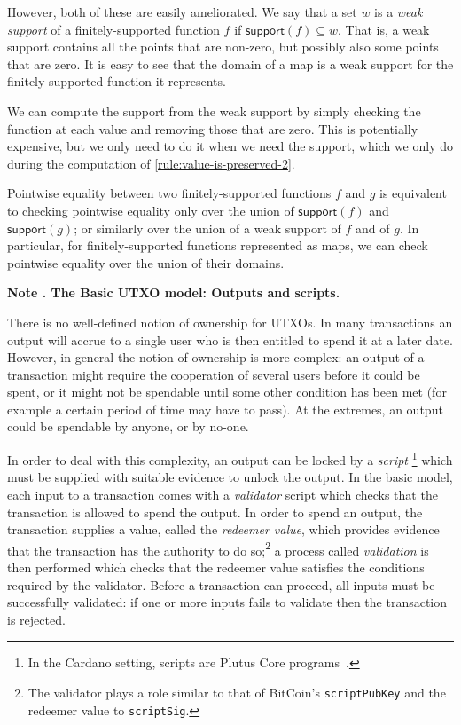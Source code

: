 \documentclass[a4paper]{article}
\newcounter{note}
\newcommand{\note}[1]{
  \bigskip
  \refstepcounter{note}
  \noindent\textbf{Note \thenote. #1}
}
\renewcommand{\i}{\textit}  %
\newcommand{\msf}[1]{\ensuremath{\mathsf{#1}}}
\newcommand{\support}{\msf{support}}
\begin{document}
However, both of these are easily ameliorated. We say that a set $w$ is a \textit{weak support}
of a finitely-supported function $f$ if $\support(f) \subseteq w$. That is, a
weak support contains all the points that are non-zero, but possibly also some
points that are zero. It is easy to see that the domain of a map is a weak
support for the finitely-supported function it represents.

We can compute the support from the weak support by simply checking the function
at each value and removing those that are zero. This is potentially expensive,
but we only need to do it when we need the support, which we only do during the
computation of \cref{rule:value-is-preserved-2}.

Pointwise equality between two finitely-supported functions $f$ and $g$ is
equivalent to checking pointwise equality only over the union of $\support(f)$
and $\support(g)$; or similarly over the union of a weak support of $f$ and of
$g$. In particular, for finitely-supported functions represented as maps, we can
check pointwise equality over the union of their domains.

\note{The Basic UTXO model: Outputs and scripts.}
\label{note:basic-utxo}
There is no well-defined notion of ownership for UTXOs.  In many
transactions an output will accrue to a single user who is then
entitled to spend it at a later date.  However, in general the notion
of ownership is more complex: an output of a transaction might require
the cooperation of several users before it could be spent, or it might
not be spendable until some other condition has been met (for example
a certain period of time may have to pass).  At the extremes, an
output could be spendable by anyone, or by no-one.

In order to deal with this complexity, an output can be locked by a
\textit{script}%
\footnote{In the Cardano setting, scripts are Plutus Core
  programs~\citep{Plutus-Core-spec}.}
which must be supplied with suitable evidence to unlock the output.
In the basic model, each input to a transaction comes with a
\i{validator} script which checks that the transaction is allowed to
spend the output.  In order to spend an output, the transaction
supplies a value, called the \i{redeemer value}, which provides
evidence that the transaction has the authority to do so;\footnote{The
  validator plays a role similar to that of BitCoin's
  \texttt{scriptPubKey} and the redeemer value to \texttt{scriptSig}.
} a process called \i{validation} is then performed which checks that
the redeemer value satisfies the conditions required by the validator.
Before a transaction can proceed, all inputs must be successfully
validated: if one or more inputs fails to validate then the
transaction is rejected.
\end{document}
